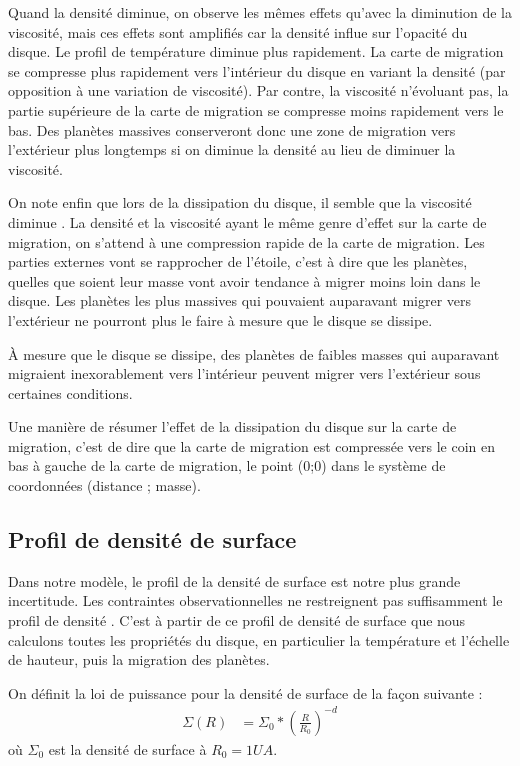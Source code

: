 Quand la densité diminue, on observe les mêmes effets qu'avec la diminution de la viscosité, mais ces effets sont amplifiés car la densité influe sur l'opacité du disque. Le profil de température diminue plus rapidement. La carte de migration se compresse plus rapidement vers l'intérieur du disque en variant la densité (par opposition à une variation de viscosité). Par contre, la viscosité n'évoluant pas, la partie supérieure de la carte de migration se compresse moins rapidement vers le bas. Des planètes massives conserveront donc une zone de migration vers l'extérieur plus longtemps si on diminue la densité au lieu de diminuer la viscosité. 

\bigskip

On note enfin que lors de la dissipation du disque, il semble que la viscosité diminue \citep[fig. 16]{guilloteau2011dual}. La densité et la viscosité ayant le même genre d'effet sur la carte de migration, on s'attend à une compression rapide de la carte de migration. Les parties externes vont se rapprocher de l'étoile, c'est à dire que les planètes, quelles que soient leur masse vont avoir tendance à migrer moins loin dans le disque. Les planètes les plus massives qui pouvaient auparavant migrer vers l'extérieur ne pourront plus le faire à mesure que le disque se dissipe. 

À mesure que le disque se dissipe, des planètes de faibles masses qui auparavant migraient inexorablement vers l'intérieur peuvent migrer vers l'extérieur sous certaines conditions. 

Une manière de résumer l'effet de la dissipation du disque sur la carte de migration, c'est de dire que la carte de migration est compressée vers le coin en bas à gauche de la carte de migration, le point (0;0) dans le système de coordonnées (distance ; masse).

\subsection{Profil de densité de surface}
Dans notre modèle, le profil de la densité de surface est notre plus grande incertitude. Les contraintes observationnelles ne
restreignent pas suffisamment le profil de densité \citep[Fig. 12]{guilloteau2011dual}. C'est à partir de ce profil de densité de surface que nous calculons toutes les propriétés du disque, en particulier la température et l'échelle de hauteur, puis la migration des planètes. 

On définit la loi de puissance pour la densité de surface de la façon suivante : 
\begin{align}
\Sigma(R) &= \Sigma_0 * \left(\frac{R}{R_0}\right)^{-d}
\end{align}
où $\Sigma_0$ est la densité de surface à $R_0=1\unit{UA}$.

